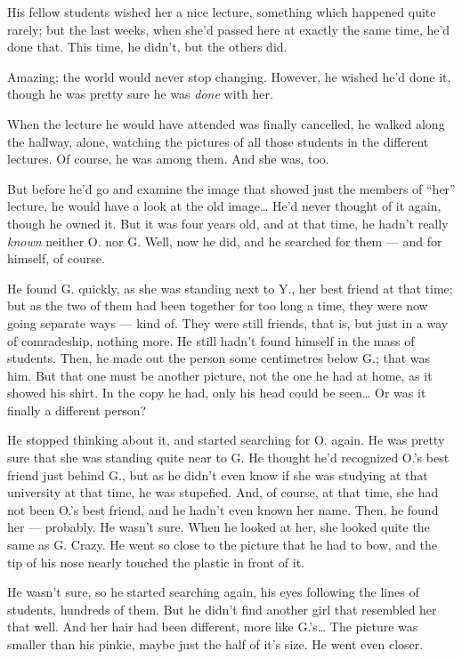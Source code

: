 His fellow students wished her a nice lecture, something which happened quite rarely; but the last weeks, when she'd passed here at exactly the same time, he'd done that. 
This time, he didn't, but the others did.

Amazing; the world would never stop changing. 
However, he wished he'd done it, though he was pretty sure he was \emph{done} with her. 

When the lecture he would have attended was finally cancelled, he walked along the hallway, alone, watching the pictures of all those students in the different lectures. 
Of course, he was among them. 
And she was, too. 

But before he'd go and examine the image that showed just the members of \enquote{her} lecture, he would have a look at the old image\ldots
He'd never thought of it again, though he owned it. 
But it was four years old, and at that time, he hadn't really \emph{known} neither O. nor G. 
Well, now he did, and he searched for them --- and for himself, of course.

He found G. quickly, as she was standing next to Y., her best friend at that time; but as the two of them had been together for too long a time, they were now going separate ways --- kind of. They were still friends, that is, but just in a way of comradeship, nothing more. 
He still hadn't found himself in the mass of students. 
Then, he made out the person some centimetres below G.; that was him. 
But that one must be another picture, not the one he had at home, as it showed his shirt. In the copy he had, only his head could be seen\ldots
Or was it finally a different person?

He stopped thinking about it, and started searching for O. again. He was pretty sure that she was standing quite near to G. He thought he'd recognized O.'s best friend just behind G., but as he didn't even know if she was studying at that university at that time, he was stupefied. And, of course, at that time, she had not been O.'s best friend, and he hadn't even known her name. 
Then, he found her --- probably. He wasn't sure. When he looked at her, she looked quite the same as G. Crazy. He went so close to the picture that he had to bow, and the tip of his nose nearly touched the plastic in front of it.

He wasn't sure, so he started searching again, his eyes following the lines of students, hundreds of them. 
But he didn't find another girl that resembled her that well. And her hair had been different, more like G.'s\ldots
The picture was smaller than his pinkie, maybe just the half of it's size. 
He went even closer.


